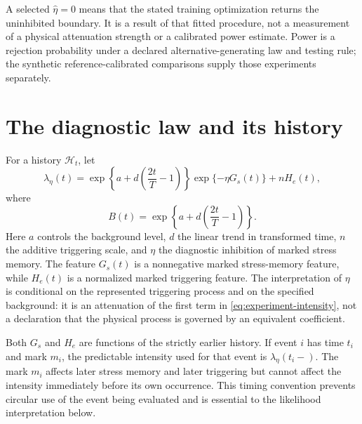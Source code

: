 A selected $\widehat\eta=0$ means that the stated training optimization returns
the uninhibited boundary. It is a result of that fitted procedure, not a
measurement of a physical attenuation strength or a calibrated power estimate.
Power is a rejection probability under a declared alternative-generating law
and testing rule; the synthetic reference-calibrated comparisons supply those
experiments separately.

\section{The diagnostic law and its history}

For a history \(\mathcal H_t\), let
\begin{equation}
\lambda_\eta(t)
=
\exp\!\left\{a+d\left(\frac{2t}{T}-1\right)\right\}
\exp\{-\eta G_s(t)\}
+
nH_e(t),
\label{eq:experiment-intensity}
\end{equation}
where
\[
B(t)
=
\exp\!\left\{a+d\left(\frac{2t}{T}-1\right)\right\}.
\]
Here \(a\) controls the background level, \(d\) the linear trend in transformed time, \(n\) the additive triggering scale, and \(\eta\) the diagnostic inhibition of marked stress memory. The feature \(G_s(t)\) is a nonnegative marked stress-memory feature, while \(H_e(t)\) is a normalized marked triggering feature. The interpretation of \(\eta\) is conditional on the represented triggering process and on the specified background: it is an attenuation of the first term in \eqref{eq:experiment-intensity}, not a declaration that the physical process is governed by an equivalent coefficient.

Both \(G_s\) and \(H_e\) are functions of the strictly earlier history. If event \(i\) has time \(t_i\) and mark \(m_i\), the predictable intensity used for that event is \(\lambda_\eta(t_i-)\). The mark \(m_i\) affects later stress memory and later triggering but cannot affect the intensity immediately before its own occurrence. This timing convention prevents circular use of the event being evaluated and is essential to the likelihood interpretation below.


